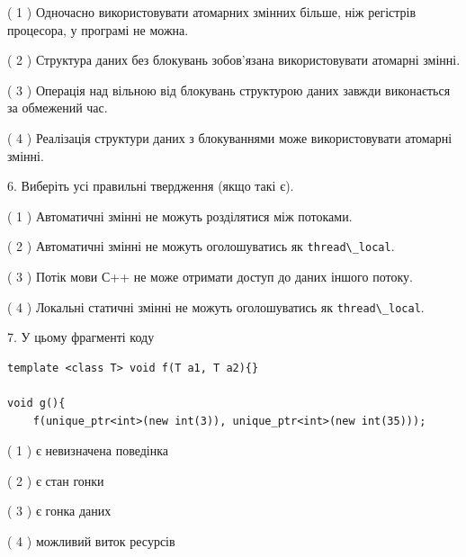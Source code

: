 \documentclass[12pt, ukrainian]{article}
\def\code#1{\Verb!#1!}
\begin{document}
\begin {large}
{( 1 ) Одночасно використовувати атомарних змінних більше, ніж регістрів процесора, у програмі не можна.%

( 2 ) Структура даних без блокувань зобов’язана використовувати атомарні змінні.%

( 3 ) Операція над вільною від блокувань структурою даних завжди виконається за обмежений час.%

( 4 ) Реалізація структури даних з блокуваннями може використовувати атомарні змінні.%
\newpage



\vspace{5mm}
6. Виберіть усі правильні твердження (якщо такі є).\par
\vspace{2mm}

( 1 ) Автоматичні змінні не можуть розділятися між потоками.%

( 2 ) Автоматичні змінні не можуть оголошуватись як \code{thread\_local}.%

( 3 ) Потік мови С++ не може отримати доступ до даних іншого потоку.%

( 4 ) Локальні статичні змінні не можуть оголошуватись як \code{thread\_local}.%


\vspace{5mm}
7. У цьому фрагменті коду
\begin{verbatim}
template <class T> void f(T a1, T a2){}

void g(){
    f(unique_ptr<int>(new int(3)), unique_ptr<int>(new int(35)));
\end{verbatim}

( 1 ) є невизначена поведінка%

( 2 ) є стан гонки%

( 3 ) є гонка даних%

( 4 ) можливий виток ресурсів%
}
\end {large}
\end{document}

